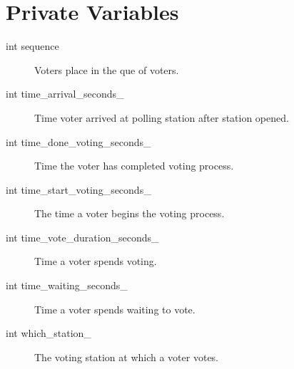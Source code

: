 \section{Private Variables}

\begin{description}
\item[int sequence] Voters place in the que of voters.
\item[int time\_arrival\_seconds\_] Time voter arrived at polling station after station opened.
\item[int time\_done\_voting\_seconds\_] Time the voter has completed voting process.
\item[int time\_start\_voting\_seconds\_] The time a voter begins the voting process.
\item[int time\_vote\_duration\_seconds\_] Time a voter spends voting.
\item[int time\_waiting\_seconds\_] Time a voter spends waiting to vote.
\item[int which\_station\_] The voting station at which a voter votes.
\end{description}


